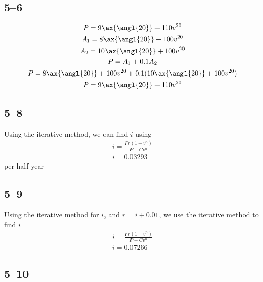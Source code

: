 \documentclass[a4paper, 12pt, reqno]{amsart}
\begin{document}
\subsection*{5--6} 

\begin{equation}\nonumber
    \begin{gathered}
        P = 9 \ax{\angl{20}} + 110 v^{20}     \\
        A_1 = 8 \ax{\angl{20}} + 100 v^{20}     \\
        A_2 = 10 \ax{\angl{20}} + 100 v^{20}     \\
        P = A_1 + 0.1 A_2       \\
        P = 8 \ax{\angl{20}} + 100 v^{20} + 0.1 (10 \ax{\angl{20}} + 100 v^{20})\\
        P = 9 \ax{\angl{20}} + 110 v^{20}     \\
    \end{gathered}
\end{equation}

\subsection*{5--8}

Using the iterative method, we can find $i$ using
\begin{equation}\nonumber
    \begin{gathered}
        i = \frac{Fr(1-v^n)}{P-Cv^n}           \\
        i = 0.03293
    \end{gathered}
\end{equation}
per half year

\subsection*{5--9}

Using the iterative method for $i$, and $r = i + 0.01$, we use the iterative
method to find $i$
\begin{equation}\nonumber
    \begin{gathered}
        i = \frac{Fr(1-v^n)}{P-Cv^n}           \\
        i = 0.07266
    \end{gathered}
\end{equation}

\subsection*{5--10}
\end{document}
